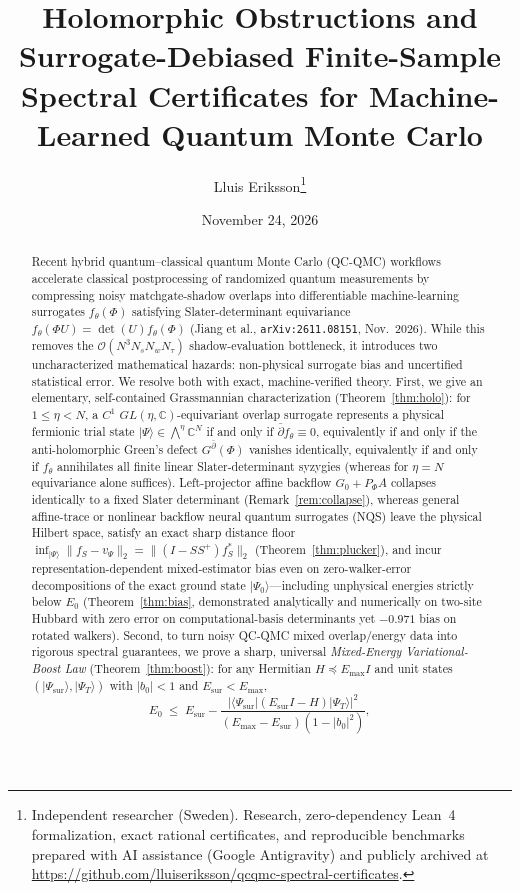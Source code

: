 \documentclass[11pt,a4paper]{article}
\title{\textbf{Holomorphic Obstructions and Surrogate-Debiased Finite-Sample Spectral Certificates for Machine-Learned Quantum Monte Carlo}}
\author{Lluis Eriksson\thanks{Independent researcher (Sweden). Research, zero-dependency Lean~4 formalization, exact rational certificates, and reproducible benchmarks prepared with AI assistance (Google Antigravity) and publicly archived at \url{https://github.com/lluiseriksson/qcqmc-spectral-certificates}.}}
\date{November 24, 2026}
\theoremstyle{definition}
\newcommand{\C}{\mathbb{C}}
\newcommand{\ket}[1]{\lvert #1 \rangle}
\newcommand{\bra}[1]{\langle #1 \rvert}
\begin{document}
\maketitle

\begin{abstract}
Recent hybrid quantum--classical quantum Monte Carlo (QC-QMC) workflows accelerate classical postprocessing of randomized quantum measurements by compressing noisy matchgate-shadow overlaps into differentiable machine-learning surrogates $f_\theta(\Phi)$ satisfying Slater-determinant equivariance $f_\theta(\Phi U) = \det(U) f_\theta(\Phi)$ (Jiang et al., \texttt{arXiv:2611.08151}, Nov.\ 2026). While this removes the $\mathcal{O}(N^3 N_s N_w N_\tau)$ shadow-evaluation bottleneck, it introduces two uncharacterized mathematical hazards: non-physical surrogate bias and uncertified statistical error. We resolve both with exact, machine-verified theory.
First, we give an elementary, self-contained Grassmannian characterization (Theorem~\ref{thm:holo}): for $1 \le \eta < N$, a $C^1$ $GL(\eta,\C)$-equivariant overlap surrogate represents a physical fermionic trial state $\ket{\Psi} \in \bigwedge^\eta \C^N$ if and only if $\bar{\partial} f_\theta \equiv 0$, equivalently if and only if the anti-holomorphic Green's defect $G^{\bar{\partial}}(\Phi)$ vanishes identically, equivalently if and only if $f_\theta$ annihilates all finite linear Slater-determinant syzygies (whereas for $\eta = N$ equivariance alone suffices). Left-projector affine backflow $G_0 + P_\Phi A$ collapses identically to a fixed Slater determinant (Remark~\ref{rem:collapse}), whereas general affine-trace or nonlinear backflow neural quantum surrogates (NQS) leave the physical Hilbert space, satisfy an exact sharp distance floor $\inf_{\ket{\Psi}} \|f_S - v_\Psi\|_2 = \|(I - S S^+) f_S^*\|_2$ (Theorem~\ref{thm:plucker}), and incur representation-dependent mixed-estimator bias even on zero-walker-error decompositions of the exact ground state $\ket{\Psi_0}$---including unphysical energies strictly below $E_0$ (Theorem~\ref{thm:bias}, demonstrated analytically and numerically on two-site Hubbard with zero error on computational-basis determinants yet $-0.971$ bias on rotated walkers).
Second, to turn noisy QC-QMC mixed overlap/energy data into rigorous spectral guarantees, we prove a sharp, universal \emph{Mixed-Energy Variational-Boost Law} (Theorem~\ref{thm:boost}): for any Hermitian $H \preceq E_{\max} I$ and unit states $(\ket{\Psi_{\mathrm{sur}}}, \ket{\Psi_T})$ with $|b_0| < 1$ and $E_{\mathrm{sur}} < E_{\max}$,
\[
  E_0 \;\le\; E_{\mathrm{sur}} - \frac{\lvert \bra{\Psi_{\mathrm{sur}}} (E_{\mathrm{sur}} I - H) \ket{\Psi_T} \rvert^2}{(E_{\max} - E_{\mathrm{sur}})(1 - |b_0|^2)},
\]
\end{abstract}
\end{document}
